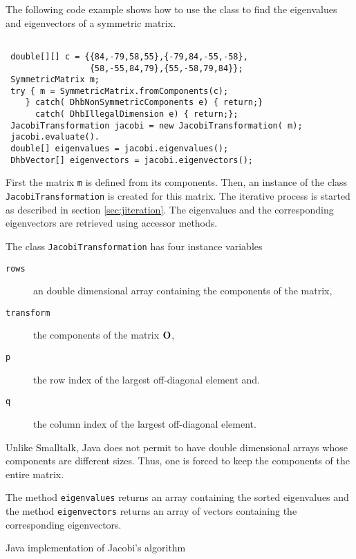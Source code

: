 \documentclass[twoside]{book}
\begin{document}
The following code example shows how to use the class to find the
eigenvalues and eigenvectors of a symmetric matrix.
\begin{codeExample}
\begin{verbatim}

 double[][] c = {{84,-79,58,55},{-79,84,-55,-58},
                 {58,-55,84,79},{55,-58,79,84}};
 SymmetricMatrix m;
 try { m = SymmetricMatrix.fromComponents(c);
    } catch( DhbNonSymmetricComponents e) { return;}
      catch( DhbIllegalDimension e) { return;};
 JacobiTransformation jacobi = new JacobiTransformation( m);
 jacobi.evaluate().
 double[] eigenvalues = jacobi.eigenvalues();
 DhbVector[] eigenvectors = jacobi.eigenvectors();
\end{verbatim}
\end{codeExample}
First the matrix {\tt m} is defined from its components. Then, an
instance of the class {\tt JacobiTransformation} is created for
this matrix. The iterative process is started as described in
section \ref{sec:jiteration}. The eigenvalues and the
corresponding eigenvectors are retrieved using accessor methods.

The class {\tt JacobiTransformation} has four instance variables
\begin{description}
  \item[\tt rows] an double dimensional array containing the
  components of the matrix,
  \item[\tt transform] the components of the matrix ${\bf O}$,
  \item[\tt p] the row index of the largest off-diagonal element and.
  \item[\tt q] the column index of the largest off-diagonal element.
\end{description}
Unlike Smalltalk, Java does not permit to have double dimensional
arrays whose components are different sizes. Thus, one is forced
to keep the components of the entire matrix.

The method {\tt eigenvalues} returns an array containing the
sorted eigenvalues and the method {\tt eigenvectors} returns an
array of vectors containing the corresponding eigenvectors.

\begin{listing} Java implementation of Jacobi's algorithm \label{lj:jacobi}

\end{listing}

\ifx\wholebook\relax\else
\end{document}
